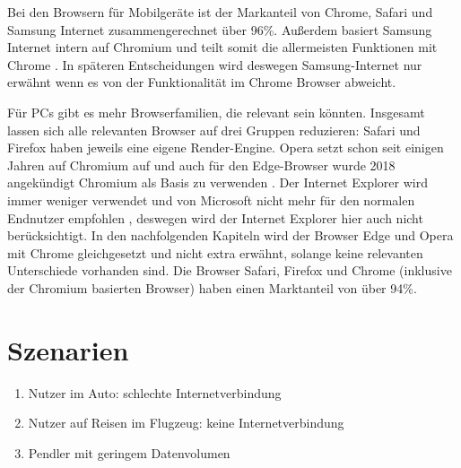 Bei den Browsern für Mobilgeräte ist der Markanteil von Chrome, Safari und Samsung Internet zusammengerechnet über 96\%. Außerdem basiert Samsung Internet intern auf Chromium und teilt somit die allermeisten Funktionen mit Chrome \autocite{samsung-webkit}. In späteren Entscheidungen wird deswegen Samsung-Internet nur erwähnt wenn es von der Funktionalität im Chrome Browser abweicht.

Für PCs gibt es mehr Browserfamilien, die relevant sein könnten. Insgesamt lassen sich alle relevanten Browser auf drei Gruppen reduzieren: Safari und Firefox haben jeweils eine eigene Render-Engine. Opera setzt schon seit einigen Jahren auf Chromium auf \autocite{opera-webkit} und auch für den Edge-Browser wurde 2018 angekündigt Chromium als Basis zu verwenden \autocite{edge-faq}. Der Internet Explorer wird immer weniger verwendet und von Microsoft nicht mehr für den normalen Endnutzer empfohlen \autocite{edge-faq}, deswegen wird der Internet Explorer hier auch nicht berücksichtigt. In den nachfolgenden Kapiteln wird der Browser Edge und Opera mit Chrome gleichgesetzt und nicht extra erwähnt, solange keine relevanten Unterschiede vorhanden sind. Die Browser Safari, Firefox und Chrome (inklusive der Chromium basierten Browser) haben einen Marktanteil von über 94\%.

\section{Szenarien}
\begin{enumerate}
	\item Nutzer im Auto: schlechte Internetverbindung
	\item Nutzer auf Reisen im Flugzeug: keine Internetverbindung
	\item Pendler mit geringem Datenvolumen
\end{enumerate}

